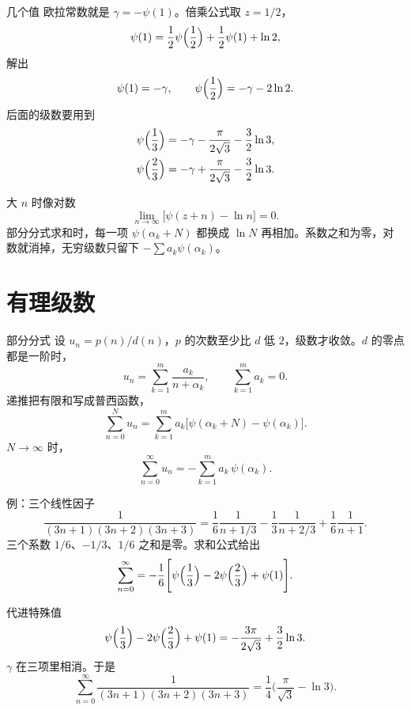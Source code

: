 \documentclass[fontset=windows, chinese, 10pt, xcolor=dvipsnames]{beamer}
\begin{document}
\begin{frame}{几个值}
  欧拉常数就是 $\gamma=-\psi(1)$。倍乘公式取 $z=1/2$，
  \[
    \psi(1)=\frac12\psi\Bigl(\frac12\Bigr)+\frac12\psi(1)+\ln 2,
  \]
  解出
  \[
    \psi(1)=-\gamma,
    \qquad
    \psi\Bigl(\frac12\Bigr)=-\gamma-2\ln 2.
  \]
  后面的级数要用到
  \begin{align*}
    \psi\Bigl(\frac13\Bigr)
    &=-\gamma-\frac{\pi}{2\sqrt{3}}-\frac32\ln 3,\\
    \psi\Bigl(\frac23\Bigr)
    &=-\gamma+\frac{\pi}{2\sqrt{3}}-\frac32\ln 3.
  \end{align*}
\end{frame}

\begin{frame}{大 $n$ 时像对数}
  \[
    \lim_{n\to\infty}\bigl[\psi(z+n)-\ln n\bigr]=0.
  \]
  部分分式求和时，每一项 $\psi(\alpha_k+N)$ 都换成 $\ln N$ 再相加。系数之和为零，对数就消掉，无穷级数只留下 $-\sum a_k\psi(\alpha_k)$。
\end{frame}

\section{有理级数}

\begin{frame}{部分分式}
  设 $u_n=p(n)/d(n)$，$p$ 的次数至少比 $d$ 低 $2$，级数才收敛。$d$ 的零点都是一阶时，
  \[
    u_n=\sum_{k=1}^{m}\frac{a_k}{n+\alpha_k},
    \qquad
    \sum_{k=1}^{m}a_k=0.
  \]
  递推把有限和写成普西函数，
  \[
    \sum_{n=0}^{N}u_n
    =\sum_{k=1}^{m}a_k
      \bigl[\psi(\alpha_k+N)-\psi(\alpha_k)\bigr].
  \]
  $N\to\infty$ 时，
  \begin{equation*}
    \boxed{\displaystyle
      \sum_{n=0}^{\infty}u_n
      =-\sum_{k=1}^{m}a_k\,\psi(\alpha_k).}
  \end{equation*}
\end{frame}

\begin{frame}{例：三个线性因子}
  \[
    \frac{1}{(3n+1)(3n+2)(3n+3)}
    =\frac16\frac{1}{n+1/3}
     -\frac13\frac{1}{n+2/3}
     +\frac16\frac{1}{n+1}.
  \]
  三个系数 $1/6$、$-1/3$、$1/6$ 之和是零。求和公式给出
  \[
    \sum_{n=0}^{\infty}
    =-\frac16\Biggl[
        \psi\Bigl(\frac13\Bigr)
        -2\psi\Bigl(\frac23\Bigr)
        +\psi(1)
      \Biggr].
  \]
\end{frame}

\begin{frame}{代进特殊值}
  \[
    \psi\Bigl(\frac13\Bigr)-2\psi\Bigl(\frac23\Bigr)+\psi(1)
    =-\frac{3\pi}{2\sqrt{3}}+\frac32\ln 3.
  \]
  $\gamma$ 在三项里相消。于是
  \[
    \sum_{n=0}^{\infty}
      \frac{1}{(3n+1)(3n+2)(3n+3)}
    =\frac14\Biggl(\frac{\pi}{\sqrt{3}}-\ln 3\Biggr).
  \]
\end{frame}
\end{document}
